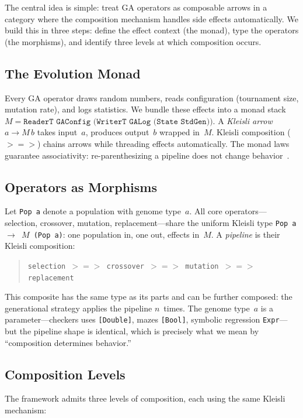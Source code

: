 \documentclass[sigconf]{acmart}
\begin{document}
The central idea is simple: treat GA operators as composable arrows in a category where the composition mechanism handles side effects automatically. We build this in three steps: define the effect context (the monad), type the operators (the morphisms), and identify three levels at which composition occurs.

\subsection{The Evolution Monad}

Every GA operator draws random numbers, reads configuration (tournament size, mutation rate), and logs statistics. We bundle these effects into a monad stack $M = \texttt{ReaderT GAConfig (WriterT GALog (State StdGen))}$. A \emph{Kleisli arrow} $a \to M\,b$ takes input~$a$, produces output~$b$ wrapped in~$M$. Kleisli composition ($\mathbin{>\!\!=\!\!>}$) chains arrows while threading effects automatically. The monad laws guarantee associativity: re-parenthesizing a pipeline does not change behavior~\cite{maclane1971categories, moggi1991notions}.

\subsection{Operators as Morphisms}

Let \texttt{Pop\,a} denote a population with genome type~$a$. All core operators---selection, crossover, mutation, replacement---share the uniform Kleisli type \texttt{Pop\,a $\to$ $M$\,(Pop\,a)}: one population in, one out, effects in~$M$. A \emph{pipeline} is their Kleisli composition:
\begin{quote}
\small\texttt{selection $\mathbin{>\!\!=\!\!>}$ crossover $\mathbin{>\!\!=\!\!>}$ mutation $\mathbin{>\!\!=\!\!>}$ replacement}
\end{quote}
\noindent This composite has the same type as its parts and can be further composed: the generational strategy applies the pipeline $n$~times. The genome type~$a$ is a parameter---checkers uses \texttt{[Double]}, mazes \texttt{[Bool]}, symbolic regression \texttt{Expr}---but the pipeline shape is identical, which is precisely what we mean by ``composition determines behavior.''

\subsection{Composition Levels}

The framework admits three levels of composition, each using the same Kleisli mechanism:
\end{document}

